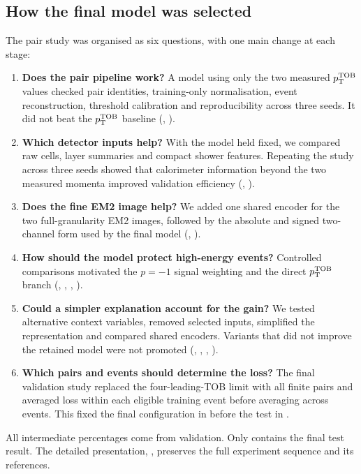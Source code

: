 \subsection{How the final model was selected}
The pair study was organised as six questions, with one main change at each
stage:
\begin{enumerate}[label=(\roman*),itemsep=1pt,topsep=2pt]
  \item \textbf{Does the pair pipeline work?} A model using only the two
  measured $p_{\mathrm{T}}^{\mathrm{TOB}}$ values checked pair identities, training-only
  normalisation, event reconstruction, threshold calibration and
  reproducibility across three seeds. It did not beat the $p_{\mathrm{T}}^{\mathrm{TOB}}$ baseline
  (, ).
  \item \textbf{Which detector inputs help?} With the model held fixed, we
  compared raw cells, layer summaries and compact shower features. Repeating
  the study across three seeds showed that calorimeter information beyond the
  two measured momenta improved validation efficiency
  (,
  ).
  \item \textbf{Does the fine EM2 image help?} We added one shared encoder for
  the two full-granularity EM2 images, followed by the absolute and signed
  two-channel form used by the final model (,
  ).
  \item \textbf{How should the model protect high-energy events?} Controlled
  comparisons motivated the $p=-1$ signal weighting and the direct $p_{\mathrm{T}}^{\mathrm{TOB}}$
  branch (, ,
  , ).
  \item \textbf{Could a simpler explanation account for the gain?} We tested
  alternative context variables, removed selected inputs, simplified the
  representation and compared shared encoders. Variants that did not improve
  the retained model were not promoted (,
  , ,
  ).
  \item \textbf{Which pairs and events should determine the loss?} The final
  validation study replaced the four-leading-TOB limit with all finite pairs
  and averaged loss within each eligible training event before averaging
  across events. This
  fixed the final configuration in
   before the test in
  .
\end{enumerate}
All intermediate percentages come from validation. Only
 contains the final test result. The detailed
presentation, , preserves
the full experiment sequence and its references.


